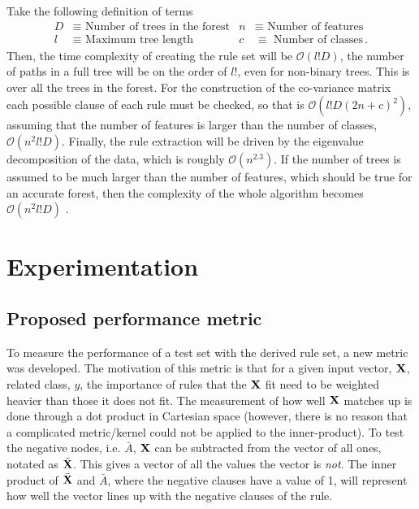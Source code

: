 \documentclass[10pt]{article}
\begin{document}
Take the following definition of terms
\begin{align*}
D & \equiv \text{ Number of trees in the forest} & n & \equiv \text{ Number of features} \\
l &\equiv \text{ Maximum tree length} & c &\equiv \text{ Number of classes} \, .
\end{align*}
Then, the time complexity of creating the rule set will be $\mathcal{O}(l! D)$, the number of paths in a full tree will be on the order of $l!$, even for non-binary trees. This is over all the trees in the forest. For the construction of the co-variance matrix each possible clause of each rule must be checked, so that is $\mathcal{O}(l!D(2n+c)^2)$, assuming that the number of features is larger than the number of classes, $\mathcal{O}(n^2l!D)$. Finally, the rule extraction will be driven by the eigenvalue decomposition of the data, which is roughly $\mathcal{O}(n^{2.3})$. If the number of trees is assumed to be much larger than the number of features, which should be true for an accurate forest, then the complexity of the whole algorithm becomes $\mathcal{O}(n^2 l! D)$ .
 
 
\section{Experimentation}
\label{sec:experiment}
\subsection{Proposed performance metric}
To measure the performance of a test set with the derived rule set, a new metric was developed. The motivation of this metric is that for a given input vector, $\vb{X}$, related class, $y$, the importance of rules that the $\vb{X}$ fit need to be weighted heavier than those it does not fit. The measurement of how well $\vb{X}$ matches up is done through a dot product in Cartesian space (however, there is no reason that a complicated metric/kernel could not be applied to the inner-product). To test the negative nodes, i.e. $\bar{A}$, $\vb{X}$ can be subtracted from the vector of all ones, notated as $\bar{\vb{X}}$. This gives a vector of all the values the vector is \textit{not}. The inner product of $\bar{\vb{X}}$ and $\bar{A}$, where the negative clauses have a value of 1, will represent how well the vector lines up with the negative clauses of the rule. 
\end{document}
